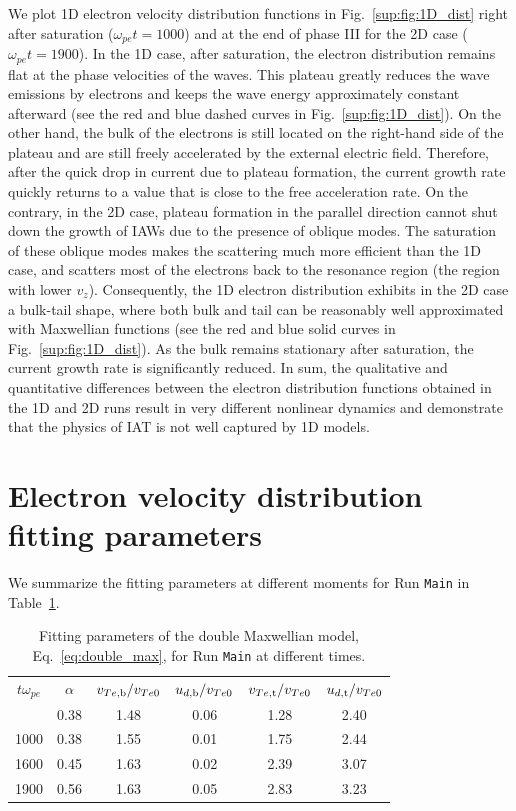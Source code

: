\documentclass[%
 reprint,
 amsmath,
 amssymb,
 aps,
 prx,
floatfix,
superscriptaddress
]{revtex4-2}
\begin{document}
We plot 1D electron velocity distribution functions in Fig.~\ref{sup:fig:1D_dist} right after saturation ($\omega_{pe}t=1000$) and at the end of phase III for the 2D case ($\omega_{pe}t=1900$).
In the 1D case, after saturation, the electron distribution remains flat at the phase velocities of the waves.
This plateau greatly reduces the wave emissions by electrons and keeps the wave energy approximately constant afterward (see the red and blue dashed curves in Fig.~\ref{sup:fig:1D_dist}).
On the other hand, the bulk of the electrons is still located on the right-hand side of the plateau and are still freely accelerated by the external electric field.
Therefore, after the quick drop in current due to plateau formation, the current growth rate quickly returns to a value that is close to the free acceleration rate.
On the contrary, in the 2D case, plateau formation in the parallel direction cannot shut down the growth of IAWs due to the presence of oblique modes.
The saturation of these oblique modes makes the scattering much more efficient than the 1D case, and scatters most of the electrons back to the resonance region (the region with lower $v_z$).
Consequently, the 1D electron distribution exhibits in the 2D case a bulk-tail shape, where both bulk and tail can be reasonably well approximated with Maxwellian functions (see the red and blue solid curves in Fig.~\ref{sup:fig:1D_dist}). As the bulk remains stationary after saturation, the current growth rate is significantly reduced.
In sum, the qualitative and quantitative differences between the electron distribution functions obtained in the 1D and 2D runs result in very different nonlinear dynamics and demonstrate that the physics of IAT is not well captured by 1D models.

\section{Electron velocity distribution fitting parameters~\label{app:2}}
We summarize the fitting parameters at different moments for Run {\tt Main} in Table~\ref{sup:tab:fitted}.

\begin{table}[!htbp]
\renewcommand\arraystretch{1.2}
\caption{\label{sup:tab:fitted} Fitting parameters of the double Maxwellian model, Eq.~\eqref{eq:double_max}, for Run {\tt Main} at different times.}
\begin{ruledtabular}
\begin{tabular}{c c c c c c}
  $t\omega_{pe} $ & $\alpha$ & $v_{Te,\rm{b}}/v_{Te0}$ & $u_{d,\rm{b}}/v_{Te0}$ & $v_{Te,\rm{t}}/v_{Te0}$ & $u_{d,\rm{t}}/v_{Te0}$ \\
\colrule 
750  &  0.38 & 1.48 & 0.06 & 1.28 & 2.40 \\
1000  & 0.38 & 1.55 & 0.01 & 1.75 & 2.44 \\
1600  & 0.45 & 1.63 & 0.02 & 2.39 & 3.07\\
1900  & 0.56 & 1.63 & 0.05 & 2.83 & 3.23\\
\end{tabular}
\end{ruledtabular}
\end{table}
\end{document}
